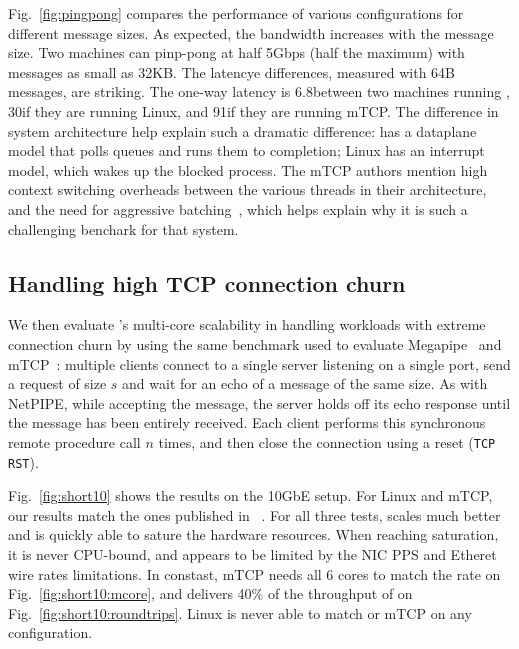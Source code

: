  Fig.~\ref{fig:pingpong} compares the performance of various
configurations for different message sizes.  As expected, the
bandwidth increases with the message size. Two \ix machines can
pinp-pong at half 5Gbps (half the maximum) with messages as small as
32KB.  The latencye differences, measured with 64B messages, are
striking.  The one-way latency is 6.8\microsecond between two machines
running \ix, 30\microsecond if they are running Linux, and
91\microsecond if they are running mTCP.  The difference in system
architecture help explain such a dramatic difference: \ix has a
dataplane model that polls queues and runs them to completion; Linux
has an interrupt model, which wakes up the blocked process.  The mTCP
authors mention high context switching overheads between the various
threads in their architecture, and the need for aggressive
batching~\cite{jeong2014mtcp}, which helps explain why it is such a
challenging benchark for that system.


\subsection{Handling high TCP connection churn}
\label{sec:eval:short}

We then evaluate \ix's multi-core scalability in handling workloads
with extreme connection churn by using the same benchmark used to evaluate
Megapipe~\cite{han2012megapipe} and mTCP~\cite{jeong2014mtcp}:
multiple clients connect to a single server listening on a single
port, send a request of size $s$ and wait for an echo of a message of
the same size.  As with NetPIPE, while accepting the message, the server holds off its
echo response until the message has been entirely received.
Each client performs this synchronous remote procedure
call $n$ times, and then close the connection using a reset
(\texttt{TCP RST}).

Fig.~\ref{fig:short10} shows the results on the 10GbE setup.  For
Linux and mTCP, our results match the ones published in
~\cite{jeong2014mtcp}.  For all three tests, \ix scales much better
and is quickly able to sature the hardware resources.  When reaching
saturation, it is never CPU-bound, and appears to be limited by the
NIC PPS and Etheret wire rates limitations.  In constast, mTCP needs
all 6 cores to match the rate on Fig.~\ref{fig:short10:mcore}, and
delivers 40\% of the throughput of \ix on
Fig.~\ref{fig:short10:roundtrips}.  Linux is never able to match \ix
or mTCP on any configuration.


